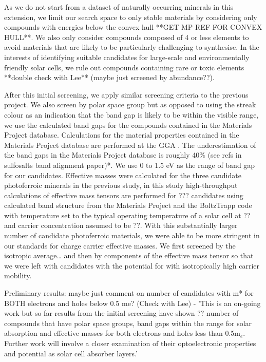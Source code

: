 \documentclass[11pt, twoside]{report}
\begin{document}
As we do not start from a dataset of naturally occurring minerals in this extension, we limit our search space to only stable materials by considering only compounds with energies below the convex hull **GET MP REF FOR CONVEX HULL**. We also only consider compounds composed of 4 or less elements to avoid materials that are likely to be particularly challenging to synthesise. In the interests of identifying suitable candidates for large-scale and environmentally friendly solar cells, we rule out compounds containing rare or toxic elements **double check with Lee** (maybe just screened by abundance??).

After this initial screening, we apply similar screening criteria to the previous project. We also screen by polar space group but as opposed to using the streak colour as an indication that the band gap is likely to be within the visible range, we use the calculated band gaps for the compounds contained in the Materials Project database. Calculations for the material properties contained in the Materials Project database are performed at the GGA \cite{GGA}.
The underestimation of the band gaps in the Materials Project database is roughly 40\% (see refs in sulfosalts band alignment paper)*. We use 0 to 1.5 eV as the range of band gap for our candidates. Effective masses were calculated for the three candidate photoferroic minerals in the previous study, in this study high-throughput calculations of effective mass tensors are performed for ??? candidates using calculated band structure from the Materials Project and the BoltzTrapp code \cite{BoltzTrapp} with temperature set to the typical operating temperature of a solar cell at ?? and carrier concentration assumed to be ??. 
With this substantially larger number of candidate photoferroic materials, we were able to be more stringent in our standards for charge carrier effective masses. We first screened by the isotropic average… and then by components of the effective mass tensor so that we were left with candidates with the potential for with isotropically high carrier mobility.

Preliminary results: maybe just comment on number of candidates with m* for BOTH electrons and holes below 0.5 me? (Check with Lee) - 'This is an on-going work but so far results from the initial screening have shown ?? number of compounds that have polar space groups, band gaps within the range for solar absorption and effective masses for both electrons and holes less than 0.5m$_e$. Further work will involve a closer examination of their optoelectronic properties and potential as solar cell absorber layers.'\\
\end{document}

